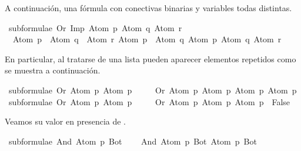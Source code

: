 \begin{isabellebody}
\begin{isamarkuptext}%
A continuación, una fórmula con conectivas binarias y variables todas distintas.%
\end{isamarkuptext}\isamarkuptrue%
\isamarkupfalse%
\ {\isachardoublequoteopen}subformulae\ {\isacharparenleft}Or\ {\isacharparenleft}Imp\ {\isacharparenleft}Atom\ p{\isacharparenright}\ {\isacharparenleft}Atom\ q{\isacharparenright}{\isacharparenright}\ {\isacharparenleft}Atom\ r{\isacharparenright}{\isacharparenright}\ {\isacharequal}\ \isanewline
\ \ {\isacharbrackleft}{\isacharparenleft}Atom\ p\ \isactrlbold {\isasymrightarrow}\ Atom\ q{\isacharparenright}\ \isactrlbold {\isasymor}\ Atom\ r{\isacharcomma}\ Atom\ p\ \isactrlbold {\isasymrightarrow}\ Atom\ q{\isacharcomma}\ Atom\ p{\isacharcomma}\ Atom\ q{\isacharcomma}\ Atom\ r{\isacharbrackright}{\isachardoublequoteclose}%
\begin{isamarkuptext}%
En particular, al tratarse de una lista pueden aparecer elementos repetidos como se muestra a
continuación.%
\end{isamarkuptext}\isamarkuptrue%
\isamarkupfalse%
\ {\isachardoublequoteopen}subformulae\ {\isacharparenleft}Or\ {\isacharparenleft}Atom\ p{\isacharparenright}\ {\isacharparenleft}Atom\ p{\isacharparenright}{\isacharparenright}\ {\isacharequal}\ \ \isanewline
\ \ {\isacharbrackleft}Or\ {\isacharparenleft}Atom\ p{\isacharparenright}\ {\isacharparenleft}Atom\ p{\isacharparenright}{\isacharcomma}\ Atom\ p{\isacharcomma}\ Atom\ p{\isacharbrackright}{\isachardoublequoteclose}\isanewline
\isanewline
{}\isamarkupfalse%
\ {\isachardoublequoteopen}subformulae\ {\isacharparenleft}Or\ {\isacharparenleft}Atom\ p{\isacharparenright}\ {\isacharparenleft}Atom\ p{\isacharparenright}{\isacharparenright}\ {\isacharequal}\ \ \isanewline
\ \ {\isacharbrackleft}Or\ {\isacharparenleft}Atom\ p{\isacharparenright}\ {\isacharparenleft}Atom\ p{\isacharparenright}{\isacharcomma}\ Atom\ p{\isacharbrackright}\ {\isacharequal}\ False{\isachardoublequoteclose}%
\begin{isamarkuptext}%
Veamos su valor en presencia de .%
\end{isamarkuptext}\isamarkuptrue%
\isamarkupfalse%
\ {\isachardoublequoteopen}subformulae\ {\isacharparenleft}And\ {\isacharparenleft}Atom\ p{\isacharparenright}\ Bot{\isacharparenright}\ {\isacharequal}\ \isanewline
\ \ {\isacharbrackleft}And\ {\isacharparenleft}Atom\ p{\isacharparenright}\ Bot{\isacharcomma}\ Atom\ p{\isacharcomma}\ Bot{\isacharbrackright}{\isachardoublequoteclose}%

\end{isabellebody}
